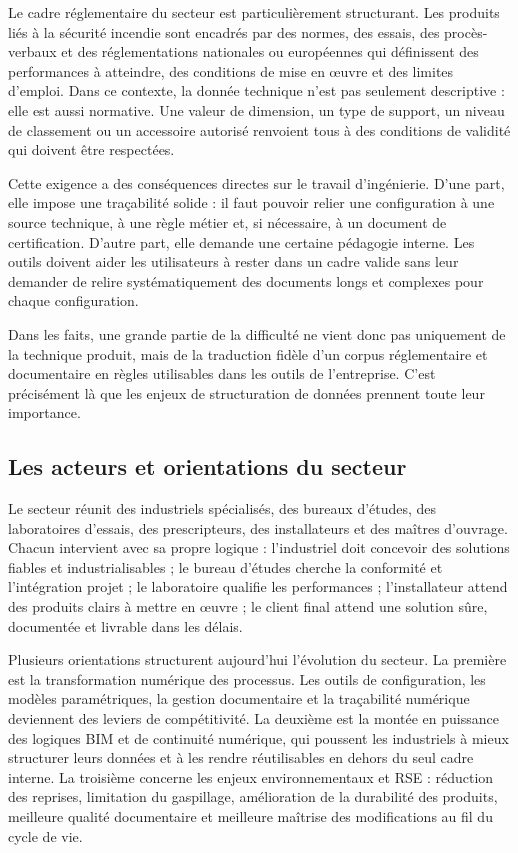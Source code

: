 Le cadre réglementaire du secteur est particulièrement structurant. Les produits liés à la sécurité incendie sont encadrés par des normes, des essais, des procès-verbaux et des réglementations nationales ou européennes qui définissent des performances à atteindre, des conditions de mise en \oe uvre et des limites d'emploi. Dans ce contexte, la donnée technique n'est pas seulement descriptive : elle est aussi normative. Une valeur de dimension, un type de support, un niveau de classement ou un accessoire autorisé renvoient tous à des conditions de validité qui doivent être respectées.

Cette exigence a des conséquences directes sur le travail d'ingénierie. D'une part, elle impose une traçabilité solide : il faut pouvoir relier une configuration à une source technique, à une règle métier et, si nécessaire, à un document de certification. D'autre part, elle demande une certaine pédagogie interne. Les outils doivent aider les utilisateurs à rester dans un cadre valide sans leur demander de relire systématiquement des documents longs et complexes pour chaque configuration.

Dans les faits, une grande partie de la difficulté ne vient donc pas uniquement de la technique produit, mais de la traduction fidèle d'un corpus réglementaire et documentaire en règles utilisables dans les outils de l'entreprise. C'est précisément là que les enjeux de structuration de données prennent toute leur importance.

\subsection{Les acteurs et orientations du secteur}

Le secteur réunit des industriels spécialisés, des bureaux d'études, des laboratoires d'essais, des prescripteurs, des installateurs et des maîtres d'ouvrage. Chacun intervient avec sa propre logique : l'industriel doit concevoir des solutions fiables et industrialisables ; le bureau d'études cherche la conformité et l'intégration projet ; le laboratoire qualifie les performances ; l'installateur attend des produits clairs à mettre en \oe uvre ; le client final attend une solution sûre, documentée et livrable dans les délais.

Plusieurs orientations structurent aujourd'hui l'évolution du secteur. La première est la transformation numérique des processus. Les outils de configuration, les modèles paramétriques, la gestion documentaire et la traçabilité numérique deviennent des leviers de compétitivité. La deuxième est la montée en puissance des logiques BIM et de continuité numérique, qui poussent les industriels à mieux structurer leurs données et à les rendre réutilisables en dehors du seul cadre interne. La troisième concerne les enjeux environnementaux et RSE : réduction des reprises, limitation du gaspillage, amélioration de la durabilité des produits, meilleure qualité documentaire et meilleure maîtrise des modifications au fil du cycle de vie.

